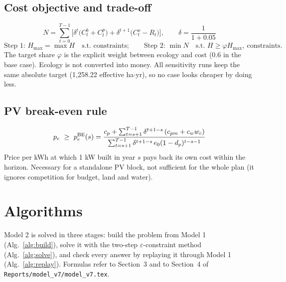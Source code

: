 \documentclass[11pt,a4paper]{article}
\begin{document}
\subsection{Cost objective and trade-off}
\begin{equation}\label{eq:npc}
N=\sum_{t=0}^{T-1}\Big[\delta^t\big(C_t^b+C_t^p\big)+\delta^{t+1}\big(C_t^o-R_t\big)\Big],\qquad \delta=\frac1{1+0.05}
\end{equation}
\begin{equation}\label{eq:eps}
\text{Step 1: }H_{\max}=\max H\quad\text{s.t. constraints};\qquad
\text{Step 2: }\min N\quad\text{s.t. } H\ge\varphi H_{\max},\ \text{constraints}.
\end{equation}
The target share $\varphi$ is the explicit weight between ecology and cost (0.6 in the base case). Ecology is not converted into money.
All sensitivity runs keep the same absolute target (1,258.22 effective ha$\cdot$yr), so no case looks cheaper by doing less.

\subsection{PV break-even rule}
\begin{equation}\label{eq:be}
p_e\ \ge\ p_e^{\rm BE}(s)=\frac{c_p+\sum_{t=s+1}^{T-1}\delta^{t+1-s}\,(c_{pm}+c_ww_c)}{\sum_{t=s+1}^{T-1}\delta^{t+1-s}\,e_0(1-d_p)^{t-s-1}}
\end{equation}
Price per kWh at which 1 kW built in year $s$ pays back its own cost within the horizon. Necessary for a standalone PV block,
not sufficient for the whole plan (it ignores competition for budget, land and water).

\section{Algorithms}\label{sec:alg}

Model 2 is solved in three stages: build the problem from Model 1 (Alg.~\ref{alg:build}),
solve it with the two-step $\varepsilon$-constraint method (Alg.~\ref{alg:solve}), and check every
answer by replaying it through Model 1 (Alg.~\ref{alg:replay}). Formulas refer to Section~3 and to
Section~4 of \texttt{Reports/model\_v7/model\_v7.tex}.
\end{document}
